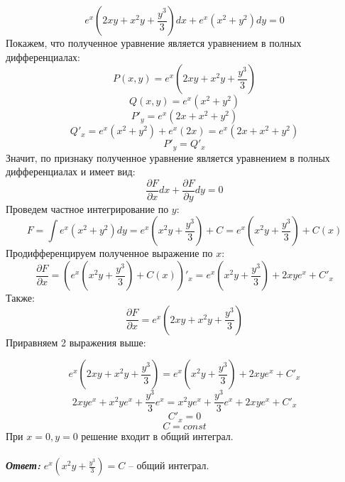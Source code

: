 \documentclass[a5paper, 10pt]{article}
\theoremstyle{definition}
\theoremstyle{plain}
\theoremstyle{remark}
\begin{document}
\begin{equation*}
e^x \left( 2xy + x^2y+\frac{y^3}{3} \right)dx + e^x \left(x^2 + y^2 \right)dy = 0
\end{equation*}
Покажем, что полученное уравнение является уравнением в полных дифференциалах:
\begin{equation*}
P(x, y) = e^x \left( 2xy + x^2y+\frac{y^3}{3} \right)
\end{equation*}
\begin{equation*}
Q(x, y) =  e^x \left(x^2 + y^2 \right)
\end{equation*}
\begin{equation*}
P'_y= e^x \left( 2x + x^2+y^2 \right)
\end{equation*}
\begin{equation*}
Q'_x =  e^x \left(x^2 + y^2 \right) + e^x \left(2x \right)  = e^x \left(2x + x^2 + y^2 \right) 
\end{equation*}
\begin{equation*}
P'_y= Q'_x 
\end{equation*}
Значит, по признаку полученное уравнение является уравнением в полных дифференциалах и имеет вид:
\begin{equation*}
\frac{\partial F}{\partial x} dx + \frac{\partial F}{\partial y} dy = 0
\end{equation*}
Проведем частное интегрирование по $y$:
\begin{equation*}
F = \int  e^x \left(x^2 + y^2 \right)dy =  e^x \left( x^2 y + \frac{y^3}{3} \right) + C =   e^x \left( x^2 y + \frac{y^3}{3} \right) + C(x)
\end{equation*}
Продифференцируем полученное выражение по $x$:
\begin{equation*}
\frac{\partial F}{\partial x} = \left( e^x \left( x^2 y + \frac{y^3}{3} \right) + C(x) \right)'_x =  e^x \left( x^2 y + \frac{y^3}{3} \right) + 2xy e^x+ C'_x
\end{equation*}
Также:
\begin{equation*}
\frac{\partial F}{\partial x} =  e^x \left( 2xy + x^2y+\frac{y^3}{3} \right)
\end{equation*}
Приравняем 2 выражения выше:

\begin{equation*}
e^x \left( 2xy + x^2y+\frac{y^3}{3} \right)  =  e^x \left( x^2 y + \frac{y^3}{3} \right) + 2xy e^x+ C'_x
\end{equation*}
\begin{equation*}
2xye^x + x^2ye^x+\frac{y^3}{3} e^x  =  x^2 ye^x + \frac{y^3}{3}e^x  + 2xy e^x+ C'_x
\end{equation*}
\begin{equation*}
C'_x = 0
\end{equation*}
\begin{equation*}
C = const
\end{equation*}
При $x = 0, y = 0$ решение входит в общий интеграл.\\\\
\textit{\textbf{Ответ:}} $ e^x \left( x^2 y + \frac{y^3}{3} \right) = C$ -- общий интеграл.
\end{document}
